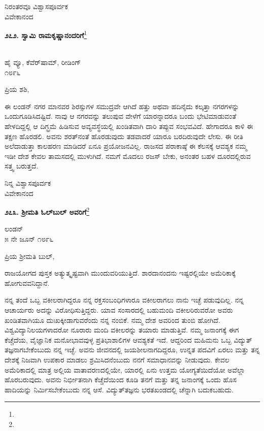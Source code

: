 {\flushright
ನಿರಂತರವೂ ವಿಶ್ವಾಸಪೂರ್ವಕ\\ವಿವೇಕಾನಂದ\par}
\vspace{0.3cm}

\begin{center}
\textbf{೨೭೨. ಸ್ವಾಮಿ ರಾಮಕೃಷ್ಣಾನಂದರಿಗೆ}\footnote{}
\end{center}

\begin{flushright}
\\ಹೈ ವ್ಯೂ, ಕೆವೆರ್‌ಷಾಮ್, ರೀಡಿಂಗ್\\೧೮೯೬
\end{flushright}

\noindent
ಪ್ರಿಯ ಶಶಿ,

ಈ ಲಂಡನ್ ನಗರ ಮಾನವರ ಶಿರಸ್ಸುಗಳ ಸಮುದ್ರವೇ ಆಗಿದೆ\enginline{-} ಹತ್ತು ಅಥವಾ ಹದಿನೈದು ಕಲ್ಕತ್ತಾ ನಗರಗಳನ್ನು ಒಂದುಗೂಡಿಸಿದಷ್ಟಿದೆ. ನಾವು ಆ ನಗರವನ್ನು ತಲುಪುವ ವೇಳೆಗೆ ಯಾರನ್ನಾದರೂ ಬಂದು ಭೇಟಿಮಾಡುವಂತೆ ಹೇಳದಿದ್ದಲ್ಲಿ ಆ ದಿಗ್ಭ್ರಮೆ ಹಿಡಿಸುವ ಅವ್ಯವಸ್ಥೆಯಲ್ಲಿ ಖಂಡಿತವಾಗಿ ದಾರಿ ತಪ್ಪುವ ಸಂಭವವಿದೆ. ಹೇಗಾದರೂ ಕಾಳಿ ಈ ತಕ್ಷಣ ಹೊರಡಲಿ. ಅವನು ಶರತ್‌ನಂತೆ ಹೊರಡುವುದು ತಡವಾದರೆ ಯಾರೂ ಬರದಿರುವುದೇ ಲೇಸು. ಈ ರೀತಿ ಅಲೆದಾಡುತ್ತಾ ಕಾಲಹರಣ ಮಾಡಿದರೆ ಏನೂ ಪ್ರಯೋಜನವಿಲ್ಲ. ರಾಜಸದ ಪರಾಕಾಷ್ಠೆ ಈ ಕೆಲಸಕ್ಕೆ ಆವಶ್ಯಕ\enginline{-} ನಮ್ಮ ಇಡೀ ದೇಶ ಕೇವಲ ತಾಮಸದಲ್ಲಿ ಮುಳುಗಿದೆ. ನಮಗೆ ಮೊದಲು ರಜಸ್ ಬೇಕು, ಅನಂತರ ಬಹಳ ದೂರದಲ್ಲಿರುವ ಸತ್ತ್ವ ಬರುತ್ತದೆ.

{\flushright
ನಿನ್ನ ವಿಶ್ವಾಸಪೂರ್ವಕ\\ವಿವೇಕಾನಂದ\par}

\begin{center}
\textbf{೨೭೩. ಶ‍್ರೀಮತಿ ಓಲ್‌ಬುಲ್‌ ಅವರಿಗೆ}\footnote{}
\end{center}

\begin{flushright}
ಲಂಡನ್\\೫ ನೇ ಜೂನ್ ೧೮೯೬
\end{flushright}

\noindent
ಪ್ರಿಯ ಶ‍್ರೀಮತಿ ಬುಲ್,

ರಾಜಯೋಗದ ಪುಸ್ತಕ ಅತ್ಯುತ್ಕೃಷ್ಟವಾಗಿ ಮುಂದುವರಿಯುತ್ತಿದೆ. ಶಾರದಾನಂದನು ಇಷ್ಟರಲ್ಲಿಯೇ ಅಮೆರಿಕಾಕ್ಕೆ ಹೋಗುವವನಿದ್ದಾನೆ.

ನನ್ನ ತಂದೆ ಒಬ್ಬ ವಕೀಲರಾಗಿದ್ದರೂ ನನ್ನ ರಕ್ತಸಂಬಂಧಿಗಳಾರೂ ವಕೀಲರಾಗಲು ನಾನು ಇಚ್ಛೆ ಪಡುವುದಿಲ್ಲ. ನನ್ನ ಆಚಾರ್ಯರು ಅದನ್ನು ವಿರೋಧಿಸುತ್ತಿದ್ದರು. ಯಾವ ಸಂಸಾರದಲ್ಲಿ ಬಹುಮಂದಿ ವಕೀಲರಿರುವರೋ ಅವರು ಖಂಡಿತವಾಗಿಯೂ ದುಃಖ\break ಕ್ಕೀಡಾಗುವರೆಂದು ನನ್ನ ನಂಬಿಕೆ. ನಮ್ಮ ದೇಶ ಅವರಿಂದ ತುಂಬಿ ಹೋಗಿದೆ. ವಿಶ್ವವಿದ್ಯಾನಿಲಯಗಳಾದರೋ ನೂರಾರು ಮಂದಿ ವಕೀಲರನ್ನು ತಯಾರು ಮಾಡುತ್ತಿವೆ. ನಮ್ಮ ಜನಾಂಗಕ್ಕೆ ಈಗ ಕೆಚ್ಚೆದೆಯ, ವೈಜ್ಞಾನಿಕ ಮನೋಭಾವವುಳ್ಳ ಪ್ರತಿಭಾಶಾಲಿಗಳ ಆವಶ್ಯಕತೆ ಇದೆ. ಆದ್ದರಿಂದ ಮಹಿಮನು ಒಬ್ಬ ವಿದ್ಯುತ್ ತಜ್ಞನಾಗಬೇಕೆಂಬುದು ನನ್ನ ಇಚ್ಛೆ. ಅವನು ಜೀವನದಲ್ಲಿ ಜಯಶೀಲನಾಗದಿದ್ದರೂ, ಉನ್ನತ ಪದವಿಗೆ ಏರಲು ಮತ್ತು ತನ್ನ ದೇಶಕ್ಕೆ ನಿಜವಾಗಿ ಉಪಕಾರ ಮಾಡಲು ಶ್ರಮಿಸಿದನೆಂಬುದು ನನಗೆ ಸಮಾಧಾನವನ್ನು ನೀಡುವುದು. ಕೇವಲ ಅಮೆರಿಕಾದಲ್ಲಿ ಮಾತ್ರ ಅಲ್ಲಿಯ ವಾತಾವರಣದಲ್ಲಿಯೇ, ಯಾರಲ್ಲಿ ಏನು ಉತ್ತಮ ಯೋಗ್ಯತೆಯಿದೆಯೋ ಅವೆಲ್ಲಾ ಹೊರಬರುವುದು. ಅವನು ನಿರ್ಭೀತನಾಗಿ ಕೆಚ್ಚೆದೆಯಿಂದ ಕೂಡಿ ತನಗೆ ಮತ್ತು ತನ್ನ ಜನಾಂಗಕ್ಕೆ ಒಂದು ಹೊಸ ಹಾದಿಯನ್ನು ನಿರ್ಮಿಸಬೇಕೆಂಬುದು ನನ್ನ ಆಸೆ. ವಿದ್ಯುತ್‌ತಜ್ಞನು ಭರತಖಂಡದಲ್ಲಿ ಚೆನ್ನಾಗಿ ಬದುಕಬಹುದು.


